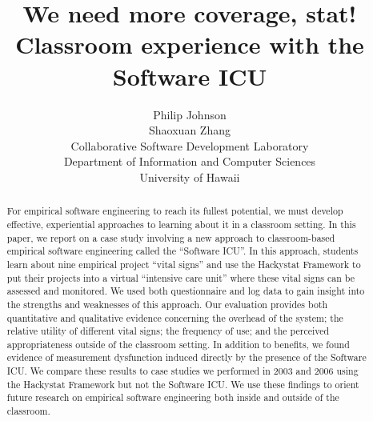 \documentclass[10pt,twocolumn]{article}
\begin{document}
\pagestyle{empty}

\title{We need more coverage, stat!  \\
Classroom experience with the Software ICU}

\author{
Philip Johnson\\
Shaoxuan Zhang \\
Collaborative Software Development Laboratory\\
Department of Information and Computer Sciences\\
University of Hawaii\\
}


\maketitle
\thispagestyle{empty}

\begin{abstract}
For empirical software engineering to reach its fullest potential, we must
develop effective, experiential approaches to learning about it in a
classroom setting.  In this paper, we report on a case study involving a
new approach to classroom-based empirical software engineering called the
``Software ICU''.  In this approach, students learn about nine empirical
project ``vital signs'' and use the Hackystat Framework to put their
projects into a virtual ``intensive care unit'' where these vital signs can
be assessed and monitored.  We used both questionnaire and log data to gain
insight into the strengths and weaknesses of this approach. Our evaluation
provides both quantitative and qualitative evidence concerning the overhead
of the system; the relative utility of different vital signs; the frequency
of use; and the perceived appropriateness outside of the classroom
setting. In addition to benefits, we found evidence of measurement
dysfunction induced directly by the presence of the Software ICU. We
compare these results to case studies we performed in 2003 and 2006 using
the Hackystat Framework but not the Software ICU.  We use these findings to
orient future research on empirical software engineering both inside and
outside of the classroom.
\end{abstract}

\end{document}
